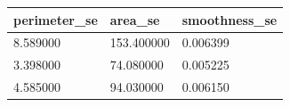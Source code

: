 \begin{tabular}{p{2cm}p{2.5cm}p{2cm}}
\toprule
perimeter\_se & area\_se & smoothness\_se \\
\midrule
8.589000 & 153.400000 & 0.006399 \\
3.398000 & 74.080000 & 0.005225 \\
4.585000 & 94.030000 & 0.006150 \\
\bottomrule
\end{tabular} 